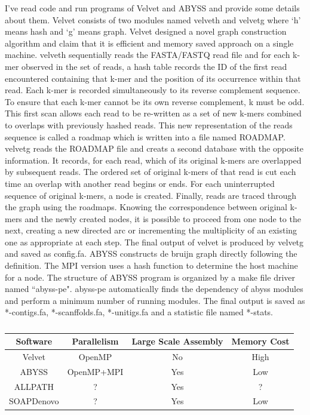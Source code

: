 \documentclass{article}
\begin{document}
I've read code and run programs of Velvet and ABYSS and provide some details about them. Velvet consists of two modules named velveth and velvetg where `h' means hash and `g' means graph. Velvet designed a novel graph construction algorithm and claim that it is efficient and memory saved approach on a single machine. velveth sequentially reads the FASTA/FASTQ read file and for each k-mer observed in the set of reads, a hash table records the ID of the first read encountered containing that k-mer and the position of its occurrence within that read. Each k-mer is recorded simultaneously to its reverse complement sequence. To ensure that each k-mer cannot be its own reverse complement, k must be odd. This first scan allows each read to be re-written as a set of new k-mers combined to overlaps with previously hashed reads. This new representation of the reads sequence is called a roadmap which is written into a file named ROADMAP. velvetg reads the ROADMAP file and creats a second database with the opposite information. It records, for each read, which of its original k-mers are overlapped by subsequent reads. The ordered set of original k-mers of that read is cut each time an overlap with another read begins or ends. For each uninterrupted sequence of original k-mers, a node is created. Finally, reads are traced through the graph using the roadmaps. Knowing the correspondence between original k-mers and the newly created nodes, it is possible to proceed from one node to the next, creating a new directed arc or incrementing the multiplicity of an existing one as appropriate at each step. The final output of velvet is produced by velvetg and saved as config.fa. ABYSS constructs de bruijn graph directly following the definition. The MPI version uses a hash function to determine the host machine for a node. The structure of ABYSS program is organized by a make file driver named ``abyss-pe". abyss-pe automatically finds the dependency of abyss modules and perform a minimum number of running modules. The final output is saved as *-contigs.fa, *-scanffolds.fa, *-unitigs.fa and a statistic file named *-stats.
\begin{table}[ht]
\begin{center}
\caption{}\label{comparison_of_assemblers}
\begin{tabular}{c|c|c|c}
\hline
Software & Parallelism & Large Scale Assembly & Memory Cost\\
\hline
Velvet & OpenMP & No & High\\
\hline
ABYSS & OpenMP+MPI & Yes & Low\\
\hline
ALLPATH& ? & Yes & ?\\
\hline
SOAPDenovo & ? & Yes &Low\\
\hline
\end{tabular}
\end{center}
\end{table}
\end{document}
